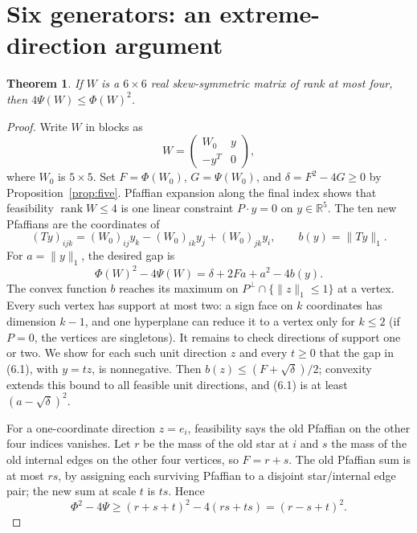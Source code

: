 \documentclass[11pt]{article}
\newtheorem{theorem}{Theorem}[section]
\newcommand{\R}{\mathbb R}
\begin{document}
\section{Six generators: an extreme-direction argument}
\begin{theorem}\label{thm:six}
If $W$ is a $6\times6$ real skew-symmetric matrix of rank at most four, then $4\Psi(W)\leq\Phi(W)^2$.
\end{theorem}
\begin{proof}
Write $W$ in blocks as
\[
 W=\begin{pmatrix}W_0&y\\-y^T&0\end{pmatrix},
\]
where $W_0$ is $5\times5$. Set $F=\Phi(W_0)$, $G=\Psi(W_0)$, and $\delta=F^2-4G\geq0$ by Proposition~\ref{prop:five}. Pfaffian expansion along the final index shows that feasibility $\operatorname{rank}W\leq4$ is one linear constraint $P\cdot y=0$ on $y\in\R^5$. The ten new Pfaffians are the coordinates of
\[
 (Ty)_{ijk}=(W_0)_{ij}y_k-(W_0)_{ik}y_j+(W_0)_{jk}y_i,
 \qquad b(y)=\|Ty\|_1.
\]
For $a=\|y\|_1$, the desired gap is
\[
 \Phi(W)^2-4\Psi(W)=\delta+2Fa+a^2-4b(y).
 \tag{6.1}
\]
The convex function $b$ reaches its maximum on $P^\perp\cap\{\|z\|_1\leq1\}$ at a vertex. Every such vertex has support at most two: a sign face on $k$ coordinates has dimension $k-1$, and one hyperplane can reduce it to a vertex only for $k\leq2$ (if $P=0$, the vertices are singletons). It remains to check directions of support one or two. We show for each such unit direction $z$ and every $t\geq0$ that the gap in (6.1), with $y=tz$, is nonnegative. Then $b(z)\leq(F+\sqrt\delta)/2$; convexity extends this bound to all feasible unit directions, and (6.1) is at least $(a-\sqrt\delta)^2$.

For a one-coordinate direction $z=e_i$, feasibility says the old Pfaffian on the other four indices vanishes. Let $r$ be the mass of the old star at $i$ and $s$ the mass of the old internal edges on the other four vertices, so $F=r+s$. The old Pfaffian sum is at most $rs$, by assigning each surviving Pfaffian to a disjoint star/internal edge pair; the new sum at scale $t$ is $ts$. Hence
\[
 \Phi^2-4\Psi\geq(r+s+t)^2-4(rs+ts)=(r-s+t)^2.
\]


\end{proof}
\end{document}
